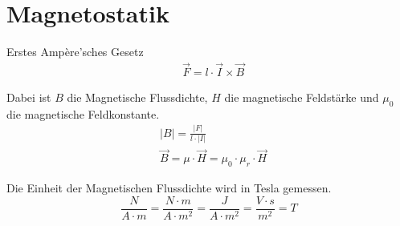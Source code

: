 \section{Magnetostatik}

Erstes Ampère'sches Gesetz
\begin{align}
	& \vec{F} = l \cdot \vec{I} \times \vec{B}
\end{align}

Dabei ist $B$ die Magnetische Flussdichte, $H$ die magnetische Feldstärke und
$\mu_0$ die magnetische Feldkonstante.
\begin{align}
	& |B| = \frac{|F|}{l \cdot |I|} \hspace{3em} \\
	& \vec{B} = \mu \cdot \vec{H} = \mu_0 \cdot \mu_r \cdot \vec{H}
\end{align}

Die Einheit der
Magnetischen Flussdichte wird in Tesla gemessen.
\[
	\frac{N}{A \cdot m}
	= \frac{N \cdot m}{A \cdot m^2}
	= \frac{J}{A \cdot m^2}
	= \frac{V \cdot s}{m^2}
	= T
\]

